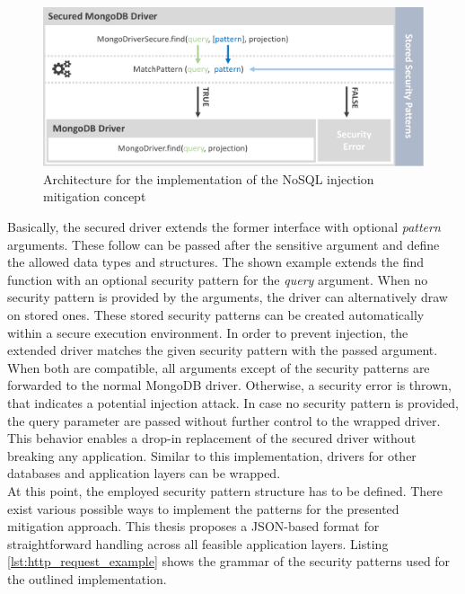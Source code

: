 \begin{figure}[h]
\centering
  \includegraphics[width=1\linewidth]{Images/secure_driver}
  \caption{Architecture for the implementation of the NoSQL injection mitigation concept}
  \label{fig:architecture_secure_driver}
\end{figure}

Basically, the secured driver extends the former interface with optional \emph{pattern} arguments. These follow can be passed after the sensitive argument and define the allowed data types and structures. The shown example extends the find function with an optional security pattern for the \emph{query} argument. When no security pattern is provided by the arguments, the driver can alternatively draw on stored ones. These stored security patterns can be created automatically within a secure execution environment. In order to prevent injection, the extended driver matches the given security pattern with the passed argument. When both are compatible, all arguments except of the security patterns are forwarded to the normal MongoDB driver. Otherwise, a security error is thrown, that indicates a potential injection attack. In case no security pattern is provided, the query parameter are passed without further control to the wrapped driver. This behavior enables a drop-in replacement of the secured driver without breaking any application. Similar to this implementation, drivers for other databases and application layers can be wrapped. \\

At this point, the employed security pattern structure has to be defined. There exist various possible ways to implement the patterns for the presented mitigation approach. This thesis proposes a JSON-based format for straightforward handling across all feasible application layers. Listing \ref{lst:http_request_example} shows the grammar of the security patterns used for the outlined implementation. \\

